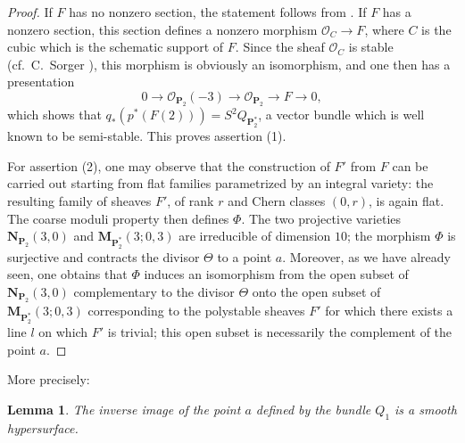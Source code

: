 \documentclass[12pt,english]{smfart}%
\theoremstyle{plain}
\newtheorem{lemma}[theorem]{Lemma}
\theoremstyle{definition}
\theoremstyle{remark}
\newcommand{\PP}{\mathbf{P}}
\newcommand{\Pd}{\PP_{2}^{*}}          %
\newcommand{\NN}{\mathbf{N}}           %
\newcommand{\MM}{\mathbf{M}}           %
\newcommand{\Oo}{\mathcal{O}}
\begin{document}
\begin{proof}
If $F$ has no nonzero section, the statement follows from . If $F$ has a nonzero section, this section defines a nonzero morphism $\Oo_C \to F$, where $C$ is the cubic which is the schematic support of $F$. Since the sheaf $\Oo_C$ is stable (cf.\ C.\ Sorger \cite{Sor}), this morphism is obviously an isomorphism, and one then has a presentation
\[
0 \longrightarrow \Oo_{\PP_2}(-3) \longrightarrow \Oo_{\PP_2}
\longrightarrow F \longrightarrow 0,
\]
which shows that $q_*(p^*(F(2))) = S^2Q_{\Pd}$, a vector bundle which is well known to be semi-stable. This proves assertion (1).

For assertion (2), one may observe that the construction of $F'$ from $F$ can be carried out starting from flat families parametrized by an integral variety: the resulting family of sheaves $F'$, of rank $r$ and Chern classes $(0,r)$, is again flat. The coarse moduli property then defines $\Phi$. The two projective varieties $\NN_{\PP_2}(3,0)$ and $\MM_{\Pd}(3;0,3)$ are irreducible of dimension $10$; the morphism $\Phi$ is surjective and contracts the divisor $\Theta$ to a point $a$. Moreover, as we have already seen, one obtains that $\Phi$ induces an isomorphism from the open subset of $\NN_{\PP_2}(3,0)$ complementary to the divisor $\Theta$ onto the open subset of $\MM_{\Pd}(3;0,3)$ corresponding to the polystable sheaves $F'$ for which there exists a line $l$ on which $F'$ is trivial; this open subset is necessarily the complement of the point $a$.
\end{proof}

More precisely:

\begin{lemma}\label{lem:Phi-inv-a}
The inverse image of the point $a$ defined by the bundle $Q_1$ is a smooth hypersurface.
\end{lemma}
\end{document}
